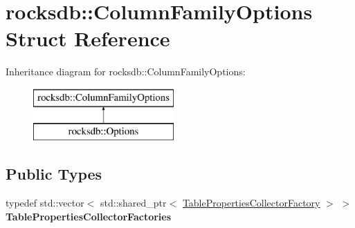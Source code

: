 \hypertarget{structrocksdb_1_1ColumnFamilyOptions}{}\section{rocksdb\+:\+:Column\+Family\+Options Struct Reference}
\label{structrocksdb_1_1ColumnFamilyOptions}
Inheritance diagram for rocksdb\+:\+:Column\+Family\+Options\+:\begin{figure}[H]
\begin{center}
\leavevmode
\includegraphics[height=2.000000cm]{structrocksdb_1_1ColumnFamilyOptions}
\end{center}
\end{figure}
\subsection*{Public Types}
\begin{DoxyCompactItemize}
\item 
typedef std\+::vector$<$ std\+::shared\+\_\+ptr$<$ \hyperlink{classrocksdb_1_1TablePropertiesCollectorFactory}{Table\+Properties\+Collector\+Factory} $>$ $>$ {\bfseries Table\+Properties\+Collector\+Factories}\hypertarget{structrocksdb_1_1ColumnFamilyOptions_a1584776ddcea2e26afc9cfa0bf632f6f}{}\label{structrocksdb_1_1ColumnFamilyOptions_a1584776ddcea2e26afc9cfa0bf632f6f}

\end{DoxyCompactItemize}
